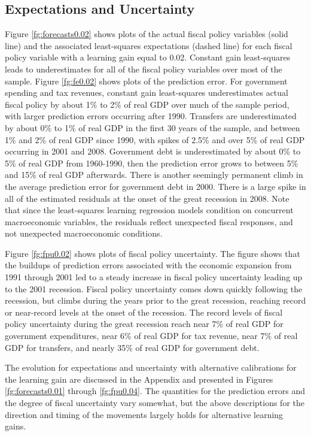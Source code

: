 \documentclass[11pt]{article}
\begin{document}
\subsection{Expectations and Uncertainty}\label{s:exp}
Figure \ref{fg:forecasts0.02} shows plots of the actual fiscal policy variables (solid line) and the associated least-squares expectations (dashed line) for each fiscal policy variable with a learning gain equal to 0.02.  Constant gain least-squares leads to underestimates for all of the fiscal policy variables over most of the sample.  Figure \ref{fg:fe0.02} shows plots of the prediction error.  For government spending and tax revenues, constant gain least-squares underestimates actual fiscal policy by about 1\% to 2\% of real GDP over much of the sample period, with larger prediction errors occurring after 1990.  Transfers are underestimated by about 0\% to 1\% of real GDP in the first 30 years of the sample, and between 1\% and 2\% of real GDP since 1990, with spikes of 2.5\% and over 5\% of real GDP occurring in 2001 and 2008.  Government debt is underestimated by about 0\% to 5\% of real GDP from 1960-1990, then the prediction error grows to between 5\% and 15\% of real GDP afterwards.  There is another seemingly permanent climb in the average prediction error for government debt in 2000.  There is a large spike in all of the estimated residuals at the onset of the great recession in 2008.  Note that since the least-squares learning regression models condition on concurrent macroeconomic variables, the residuals reflect unexpected fiscal responses, and not unexpected macroeconomic conditions.

Figure \ref{fg:fpu0.02} shows plots of fiscal policy uncertainty.  The figure shows that the buildups of prediction errors associated with the economic expansion from 1991 through 2001 led to a steady increase in fiscal policy uncertainty leading up to the 2001 recession.  Fiscal policy uncertainty comes down quickly following the recession, but climbs during the years prior to the great recession, reaching record or near-record levels at the onset of the recession.  The record levels of fiscal policy uncertainty during the great recession reach near 7\% of real GDP for government expenditures, near 6\% of real GDP for tax revenue, near 7\% of real GDP for transfers, and nearly 35\% of real GDP for government debt.  

The evolution for expectations and uncertainty with alternative calibrations for the learning gain are discussed in the Appendix and presented in Figures \ref{fg:forecasts0.01} through \ref{fg:fpu0.04}.  The quantities for the prediction errors and the degree of fiscal uncertainty vary somewhat, but the above descriptions for the direction and timing of the movements largely holds for alternative learning gains.
\end{document}
